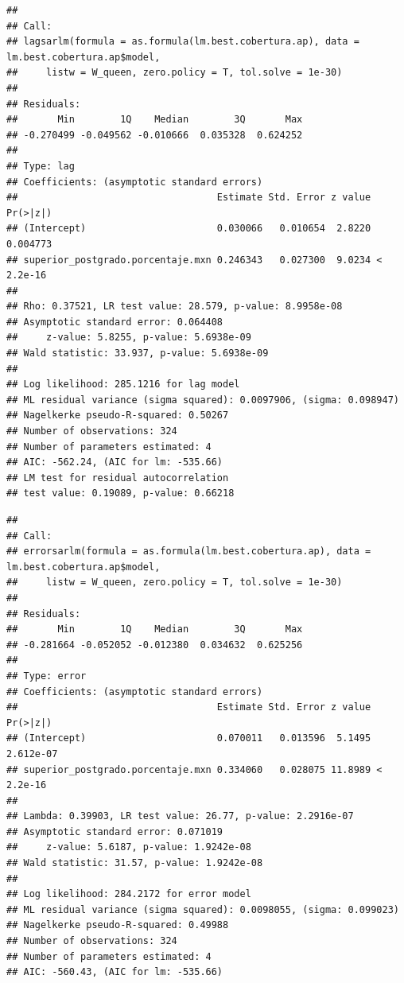 \documentclass[12pt,]{book}
\newenvironment{Shaded}{\begin{snugshade}}{\end{snugshade}}
\newcommand{\KeywordTok}[1]{\textcolor[rgb]{0.13,0.29,0.53}{\textbf{#1}}}
\newcommand{\DataTypeTok}[1]{\textcolor[rgb]{0.13,0.29,0.53}{#1}}
\newcommand{\FloatTok}[1]{\textcolor[rgb]{0.00,0.00,0.81}{#1}}
\newcommand{\StringTok}[1]{\textcolor[rgb]{0.31,0.60,0.02}{#1}}
\newcommand{\CommentTok}[1]{\textcolor[rgb]{0.56,0.35,0.01}{\textit{#1}}}
\newcommand{\OperatorTok}[1]{\textcolor[rgb]{0.81,0.36,0.00}{\textbf{#1}}}
\newcommand{\NormalTok}[1]{#1}
\begin{document}
\begin{verbatim}
## 
## Call:
## lagsarlm(formula = as.formula(lm.best.cobertura.ap), data = lm.best.cobertura.ap$model, 
##     listw = W_queen, zero.policy = T, tol.solve = 1e-30)
## 
## Residuals:
##       Min        1Q    Median        3Q       Max 
## -0.270499 -0.049562 -0.010666  0.035328  0.624252 
## 
## Type: lag 
## Coefficients: (asymptotic standard errors) 
##                                   Estimate Std. Error z value  Pr(>|z|)
## (Intercept)                       0.030066   0.010654  2.8220  0.004773
## superior_postgrado.porcentaje.mxn 0.246343   0.027300  9.0234 < 2.2e-16
## 
## Rho: 0.37521, LR test value: 28.579, p-value: 8.9958e-08
## Asymptotic standard error: 0.064408
##     z-value: 5.8255, p-value: 5.6938e-09
## Wald statistic: 33.937, p-value: 5.6938e-09
## 
## Log likelihood: 285.1216 for lag model
## ML residual variance (sigma squared): 0.0097906, (sigma: 0.098947)
## Nagelkerke pseudo-R-squared: 0.50267 
## Number of observations: 324 
## Number of parameters estimated: 4 
## AIC: -562.24, (AIC for lm: -535.66)
## LM test for residual autocorrelation
## test value: 0.19089, p-value: 0.66218
\end{verbatim}

\begin{Shaded}
\end{Shaded}

\begin{verbatim}
## 
## Call:
## errorsarlm(formula = as.formula(lm.best.cobertura.ap), data = lm.best.cobertura.ap$model, 
##     listw = W_queen, zero.policy = T, tol.solve = 1e-30)
## 
## Residuals:
##       Min        1Q    Median        3Q       Max 
## -0.281664 -0.052052 -0.012380  0.034632  0.625256 
## 
## Type: error 
## Coefficients: (asymptotic standard errors) 
##                                   Estimate Std. Error z value  Pr(>|z|)
## (Intercept)                       0.070011   0.013596  5.1495 2.612e-07
## superior_postgrado.porcentaje.mxn 0.334060   0.028075 11.8989 < 2.2e-16
## 
## Lambda: 0.39903, LR test value: 26.77, p-value: 2.2916e-07
## Asymptotic standard error: 0.071019
##     z-value: 5.6187, p-value: 1.9242e-08
## Wald statistic: 31.57, p-value: 1.9242e-08
## 
## Log likelihood: 284.2172 for error model
## ML residual variance (sigma squared): 0.0098055, (sigma: 0.099023)
## Nagelkerke pseudo-R-squared: 0.49988 
## Number of observations: 324 
## Number of parameters estimated: 4 
## AIC: -560.43, (AIC for lm: -535.66)
\end{verbatim}
\end{document}
